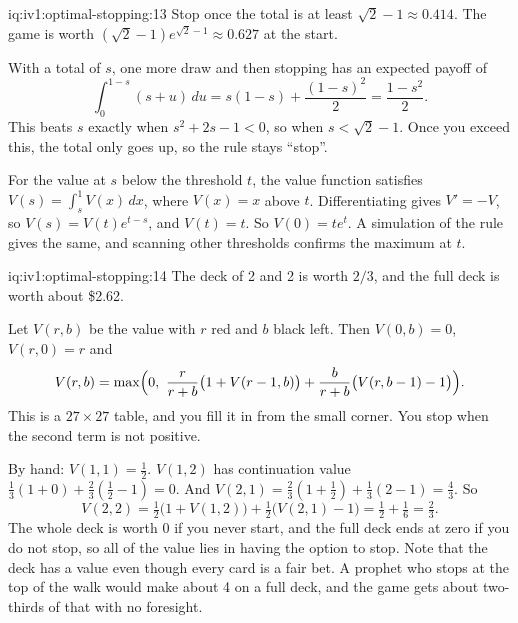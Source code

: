 \begin{solution}{iq:iv1:optimal-stopping:13}
Stop once the total is at least $\sqrt{2} - 1 \approx 0.414$. The game is worth $(\sqrt{2} - 1)e^{\sqrt{2} - 1} \approx 0.627$ at the start.

With a total of $s$, one more draw and then stopping has an expected payoff of
\[
\int_0^{1 - s} (s + u)\,du = s(1 - s) + \frac{(1 - s)^2}{2} = \frac{1 - s^2}{2}.
\]
This beats $s$ exactly when $s^2 + 2s - 1 < 0$, so when $s < \sqrt{2} - 1$. Once you exceed this, the total only goes up, so the rule stays ``stop''.

For the value at $s$ below the threshold $t$, the value function satisfies $V(s) = \int_s^1 V(x)\,dx$, where $V(x) = x$ above $t$. Differentiating gives $V' = -V$, so $V(s) = V(t)e^{t - s}$, and $V(t) = t$. So $V(0) = te^t$. A simulation of the rule gives the same, and scanning other thresholds confirms the maximum at $t$.

\end{solution}

\begin{solution}{iq:iv1:optimal-stopping:14}
The deck of 2 and 2 is worth $2/3$, and the full deck is worth about \$2.62.

Let $V(r, b)$ be the value with $r$ red and $b$ black left. Then $V(0, b) = 0$, $V(r, 0) = r$ and
\[
V(r, b) = \max\Bigl(0,\ \frac{r}{r + b}\bigl(1 + V(r - 1, b)\bigr) + \frac{b}{r + b}\bigl(V(r, b - 1) - 1\bigr)\Bigr).
\]
This is a $27 \times 27$ table, and you fill it in from the small corner. You stop when the second term is not positive.

By hand: $V(1, 1) = \tfrac12$. $V(1, 2)$ has continuation value $\tfrac13(1 + 0) + \tfrac23(\tfrac12 - 1) = 0$. And $V(2, 1) = \tfrac23(1 + \tfrac12) + \tfrac13(2 - 1) = \tfrac43$. So
\[
V(2, 2) = \tfrac12\bigl(1 + V(1, 2)\bigr) + \tfrac12\bigl(V(2, 1) - 1\bigr) = \tfrac12 + \tfrac16 = \tfrac23.
\]
The whole deck is worth 0 if you never start, and the full deck ends at zero if you do not stop, so all of the value lies in having the option to stop. Note that the deck has a value even though every card is a fair bet. A prophet who stops at the top of the walk would make about 4 on a full deck, and the game gets about two-thirds of that with no foresight.

\end{solution}

